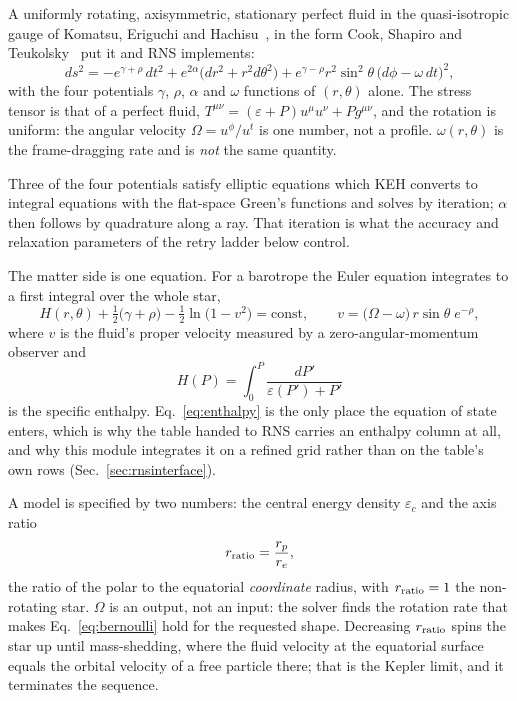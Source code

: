 \documentclass[aps,prc,onecolumn,superscriptaddress,nofootinbib,10pt]{revtex4-2}
\begin{document}
A uniformly rotating, axisymmetric, stationary perfect fluid in the
quasi-isotropic gauge of Komatsu, Eriguchi and
Hachisu~\cite{Komatsu1989}, in the form Cook, Shapiro and
Teukolsky~\cite{CookShapiroTeukolsky1994} put it and RNS implements:
%
\begin{equation}
ds^2 = -e^{\gamma+\rho}\,dt^2 + e^{2\alpha}\big(dr^2 + r^2 d\theta^2\big)
       + e^{\gamma-\rho} r^2\sin^2\!\theta\,\big(d\phi - \omega\,dt\big)^2 ,
\label{eq:kehmetric}
\end{equation}
%
with the four potentials $\gamma$, $\rho$, $\alpha$ and $\omega$ functions of
$(r,\theta)$ alone. The stress tensor is that of a perfect fluid,
$T^{\mu\nu} = (\varepsilon + P)u^\mu u^\nu + P g^{\mu\nu}$, and the rotation is
uniform: the angular velocity $\Omega = u^\phi/u^t$ is one number, not a
profile. $\omega(r,\theta)$ is the frame-dragging rate and is \emph{not} the
same quantity.

Three of the four potentials satisfy elliptic equations which KEH converts to
integral equations with the flat-space Green's functions and solves by
iteration; $\alpha$ then follows by quadrature along a ray. That iteration is
what the accuracy and relaxation parameters of the retry ladder below control.

The matter side is one equation. For a barotrope the Euler equation integrates
to a first integral over the whole star,
%
\begin{equation}
H(r,\theta) + \tfrac12\big(\gamma + \rho\big)
  - \tfrac12\ln\!\big(1 - v^2\big) = \text{const} ,
\qquad
v = \big(\Omega - \omega\big)\,r\sin\theta\;e^{-\rho} ,
\label{eq:bernoulli}
\end{equation}
%
where $v$ is the fluid's proper velocity measured by a zero-angular-momentum
observer and
%
\begin{equation}
H(P) = \int_0^{P}\frac{dP'}{\varepsilon(P') + P'}
\label{eq:enthalpy}
\end{equation}
%
is the specific enthalpy. Eq.~\eqref{eq:enthalpy} is the only place the
equation of state enters, which is why the table handed to RNS carries an
enthalpy column at all, and why this module integrates it on a refined grid
rather than on the table's own rows (Sec.~\ref{sec:rnsinterface}).

A model is specified by two numbers: the central energy density
$\varepsilon_c$ and the axis ratio
%
\begin{equation}
r_{\rm ratio} = \frac{r_p}{r_e} ,
\end{equation}
%
the ratio of the polar to the equatorial \emph{coordinate} radius, with
$r_{\rm ratio} = 1$ the non-rotating star. $\Omega$ is an output, not an input:
the solver finds the rotation rate that makes Eq.~\eqref{eq:bernoulli} hold for
the requested shape. Decreasing $r_{\rm ratio}$ spins the star up until
mass-shedding, where the fluid velocity at the equatorial surface equals the
orbital velocity of a free particle there; that is the Kepler limit, and it
terminates the sequence.
\end{document}

